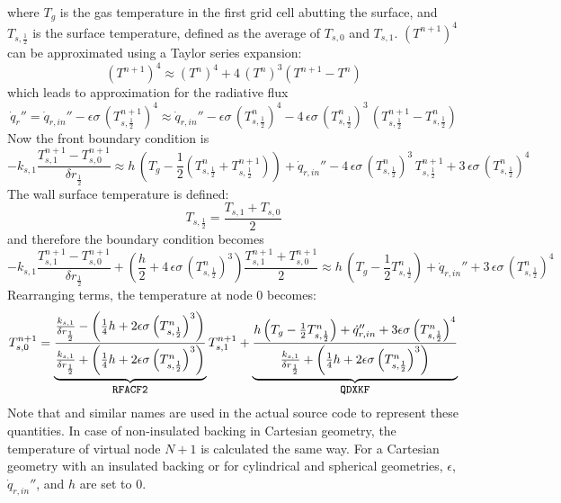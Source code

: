 where $T_g$ is the gas temperature in the first grid cell abutting the surface, and $T_{s,\frac{1}{2}}$ is the surface temperature, defined as the average of $T_{s,0}$ and $T_{s,1}$.
$(T^{n+1})^4$ can be approximated using a Taylor series expansion:
\begin{equation}
\label{T_taylor}
(T^{n+1})^4 \approx (T^n)^4 + 4 \, (T^n)^3 (T^{n+1}-T^n)
\end{equation}
which leads to approximation for the radiative flux
\begin{equation}
\label{radi}
\dot{q}_r'' = \dot{q}_{r, in}'' - \epsilon \sigma \, \left( T_{s,\frac{1}{2}}^{n+1} \right)^4
  \approx \dot{q}_{r, in}'' - \epsilon \sigma \, \left( T_{s,\frac{1}{2}}^n \right)^4 - 4 \, \epsilon\sigma \, \left( T_{s,\frac{1}{2}}^n \right)^3 \, \left( T_{s,\frac{1}{2}}^{n+1}-T_{s,\frac{1}{2}}^n \right)
\end{equation}
Now the front boundary condition is
\begin{equation}
\label{bc_front_2}
  -k_{s,1} \frac{T_{s,1}^{n+1}-T_{s,0}^{n+1}}{\delta r_{\frac{1}{2}}}
  \approx h \, \left( T_g - \frac{1}{2} \left( T_{s,\frac{1}{2}}^n+T_{s,\frac{1}{2}}^{n+1} \right) \right) +
  \dot{q}_{r, in}'' - 4 \, \epsilon\sigma \, \left(T_{s,\frac{1}{2}}^n \right)^3 \, T_{s,\frac{1}{2}}^{n+1} + 3 \, \epsilon\sigma \, \left( T_{s,\frac{1}{2}}^n \right)^4
\end{equation}
The wall surface temperature is defined:
\begin{equation}
\label{T_front}
  T_{s,\frac{1}{2}} = \frac{T_{s,1}+T_{s,0}}{2}
\end{equation}
and therefore the boundary condition becomes
\begin{equation}
\label{bc_front_4}
  -k_{s,1} \frac{T_{s,1}^{n+1}-T_{s,0}^{n+1}}{\delta r_{\frac{1}{2}}} + \left( \frac{h}{2} + 4 \, \epsilon\sigma \, \left( T_{s,\frac{1}{2}}^n \right)^3 \right) \frac{T_{s,1}^{n+1}+T_{s,0}^{n+1}}{2}
  \approx h\, \left( T_g - \frac{1}{2}T_{s,\frac{1}{2}}^n \right) +
  \dot{q}_{r, in}'' + 3 \, \epsilon\sigma \, \left( T_{s,\frac{1}{2}}^n \right)^4
\end{equation}
Rearranging terms, the temperature at node 0 becomes:
\begin{equation}
\label{T0}
  T_{s,0}^{n+1} = \underbrace{\frac{\frac{k_{s,1}}{\delta r_{\frac{1}{2}}}- \left(\frac{1}{4}h+2\epsilon \sigma \left(T_{s,\frac{1}{2}}^n\right)^3 \right)}{\frac{k_{s,1}}{\delta r_{\frac{1}{2}}} + \left(\frac{1}{4}h+2\epsilon \sigma \left( T_{s,\frac{1}{2}}^n\right)^3 \right)}}_{\texttt{\small RFACF2}} T_{s,1}^{n+1} +
 \underbrace{\frac{h \left(T_g-\frac{1}{2}T_{s,\frac{1}{2}}^n\right)+\dot{q}_{r,in}''+3\epsilon \sigma \left( T_{s,\frac{1}{2}}^n\right)^4}{\frac{k_{s,1}}{\delta r_{\frac{1}{2}}}+\left(\frac{1}{4}h+2\epsilon \sigma \left( T_{s,\frac{1}{2}}^n\right)^3 \right)}}_{\texttt{\small QDXKF}}
\end{equation}
Note that  and similar names are used in the actual source code to represent these quantities.
In case of non-insulated backing in Cartesian geometry, the temperature of virtual node $N+1$ is calculated the same way.
For a Cartesian geometry with an insulated backing or for cylindrical and spherical geometries, $\epsilon$, $\dot{q}_{r,in}''$, and $h$ are set to 0.

